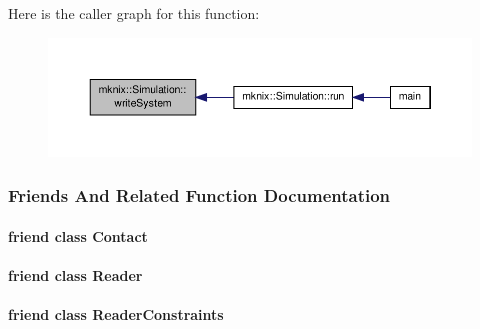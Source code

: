 Here is the caller graph for this function\-:\nopagebreak
\begin{figure}[H]
\begin{center}
\leavevmode
\includegraphics[width=350pt]{db/d0b/classmknix_1_1_simulation_acef86e75795b95441e06f1055402a43b_icgraph}
\end{center}
\end{figure}




\subsubsection{Friends And Related Function Documentation}
\hypertarget{classmknix_1_1_simulation_a76d4b1c8c6040df20040808941b7e764}{
\paragraph[{Contact}]{\setlength{\rightskip}{0pt plus 5cm}friend class {\bf Contact}\hspace{0.3cm}{\ttfamily [friend]}}}\label{classmknix_1_1_simulation_a76d4b1c8c6040df20040808941b7e764}
\hypertarget{classmknix_1_1_simulation_a35cb182752752c74a30050705acc3c06}{
\paragraph[{Reader}]{\setlength{\rightskip}{0pt plus 5cm}friend class {\bf Reader}\hspace{0.3cm}{\ttfamily [friend]}}}\label{classmknix_1_1_simulation_a35cb182752752c74a30050705acc3c06}
\hypertarget{classmknix_1_1_simulation_ae164a82e4890f6fbab13f95a18656edf}{
\paragraph[{Reader\-Constraints}]{\setlength{\rightskip}{0pt plus 5cm}friend class {\bf Reader\-Constraints}\hspace{0.3cm}{\ttfamily [friend]}}}\label{classmknix_1_1_simulation_ae164a82e4890f6fbab13f95a18656edf}
